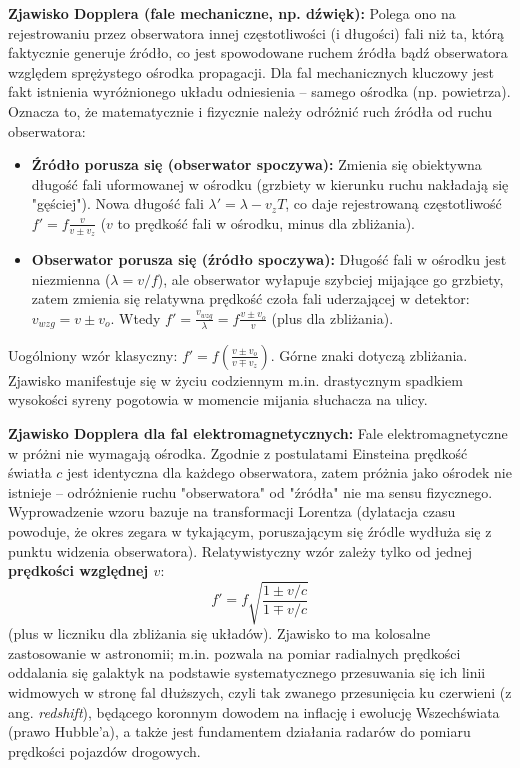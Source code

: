 \documentclass[11pt, a4paper]{article}
\begin{document}
\textbf{Zjawisko Dopplera (fale mechaniczne, np. dźwięk):}
Polega ono na rejestrowaniu przez obserwatora innej częstotliwości (i długości) fali niż ta, którą faktycznie generuje źródło, co jest spowodowane ruchem źródła bądź obserwatora względem sprężystego ośrodka propagacji.
Dla fal mechanicznych kluczowy jest fakt istnienia wyróżnionego układu odniesienia – samego ośrodka (np. powietrza). Oznacza to, że matematycznie i fizycznie należy odróżnić ruch źródła od ruchu obserwatora:
\begin{itemize}
    \item \textbf{Źródło porusza się (obserwator spoczywa):} Zmienia się obiektywna długość fali uformowanej w ośrodku (grzbiety w kierunku ruchu nakładają się "gęściej"). Nowa długość fali $\lambda' = \lambda - v_z T$, co daje rejestrowaną częstotliwość $f' = f \frac{v}{v \pm v_z}$ ($v$ to prędkość fali w ośrodku, minus dla zbliżania).
    \item \textbf{Obserwator porusza się (źródło spoczywa):} Długość fali w ośrodku jest niezmienna ($\lambda = v/f$), ale obserwator wyłapuje szybciej mijające go grzbiety, zatem zmienia się relatywna prędkość czoła fali uderzającej w detektor: $v_{wzg} = v \pm v_o$. Wtedy $f' = \frac{v_{wzg}}{\lambda} = f \frac{v \pm v_o}{v}$ (plus dla zbliżania).
\end{itemize}
Uogólniony wzór klasyczny: $f' = f \left(\frac{v \pm v_o}{v \mp v_z}\right)$. Górne znaki dotyczą zbliżania. Zjawisko manifestuje się w życiu codziennym m.in. drastycznym spadkiem wysokości syreny pogotowia w momencie mijania słuchacza na ulicy.

\textbf{Zjawisko Dopplera dla fal elektromagnetycznych:}
Fale elektromagnetyczne w próżni nie wymagają ośrodka. Zgodnie z postulatami Einsteina prędkość światła $c$ jest identyczna dla każdego obserwatora, zatem próżnia jako ośrodek nie istnieje – odróżnienie ruchu "obserwatora" od "źródła" nie ma sensu fizycznego. Wyprowadzenie wzoru bazuje na transformacji Lorentza (dylatacja czasu powoduje, że okres zegara w tykającym, poruszającym się źródle wydłuża się z punktu widzenia obserwatora). Relatywistyczny wzór zależy tylko od jednej \textbf{prędkości względnej $v$}:
\[
f' = f \sqrt{\frac{1 \pm v/c}{1 \mp v/c}}
\]
(plus w liczniku dla zbliżania się układów). Zjawisko to ma kolosalne zastosowanie w astronomii; m.in. pozwala na pomiar radialnych prędkości oddalania się galaktyk na podstawie systematycznego przesuwania się ich linii widmowych w stronę fal dłuższych, czyli tak zwanego przesunięcia ku czerwieni (z ang. \textit{redshift}), będącego koronnym dowodem na inflację i ewolucję Wszechświata (prawo Hubble'a), a także jest fundamentem działania radarów do pomiaru prędkości pojazdów drogowych.
\end{document}
